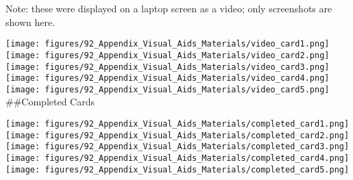 Note: these were displayed on a laptop screen as a video; only
screenshots are shown here.

\texttt{[image: figures/92\_Appendix\_Visual\_Aids\_Materials/video\_card1.png]}\\\texttt{[image: figures/92\_Appendix\_Visual\_Aids\_Materials/video\_card2.png]}\\\texttt{[image: figures/92\_Appendix\_Visual\_Aids\_Materials/video\_card3.png]}\\\texttt{[image: figures/92\_Appendix\_Visual\_Aids\_Materials/video\_card4.png]}\\\texttt{[image: figures/92\_Appendix\_Visual\_Aids\_Materials/video\_card5.png]}\\
\#\#Completed Cards

\texttt{[image: figures/92\_Appendix\_Visual\_Aids\_Materials/completed\_card1.png]}\\\texttt{[image: figures/92\_Appendix\_Visual\_Aids\_Materials/completed\_card2.png]}\\\texttt{[image: figures/92\_Appendix\_Visual\_Aids\_Materials/completed\_card3.png]}\\\texttt{[image: figures/92\_Appendix\_Visual\_Aids\_Materials/completed\_card4.png]}\\\texttt{[image: figures/92\_Appendix\_Visual\_Aids\_Materials/completed\_card5.png]}\\
